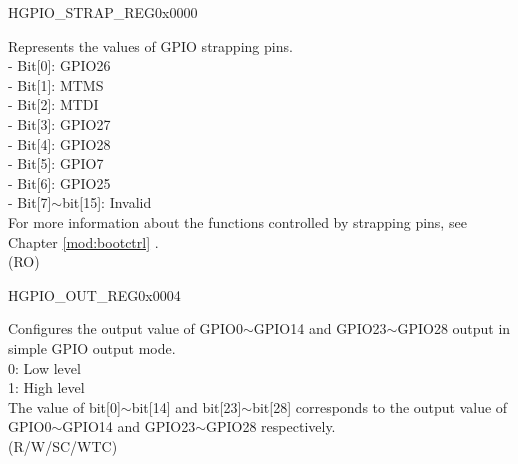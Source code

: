 \begin{register}{H}{GPIO\_STRAP\_REG}{0x0000}\label{regdesc:GPIOSTRAPREG}
%
%
\regnewline%
\begin{regdesc}\begin{reglist}
\label{fielddesc:GPIOSTRAPPING}\item [GPIO\_STRAPPING] Represents the values of GPIO strapping pins. \\
    - Bit[0]: GPIO26\\
    - Bit[1]: MTMS\\
    - Bit[2]: MTDI\\
    - Bit[3]: GPIO27\\
    - Bit[4]: GPIO28\\
    - Bit[5]: GPIO7\\
    - Bit[6]: GPIO25\\
    - Bit[7]$\sim$bit[15]: Invalid\\
For more information about the functions controlled by strapping pins, see Chapter \ref{mod:bootctrl} \textit{}.\\
 (RO)
\end{reglist}\end{regdesc}
\end{register}


\begin{register}{H}{GPIO\_OUT\_REG}{0x0004}\label{regdesc:GPIOOUTREG}
%
\regnewline%
\begin{regdesc}\begin{reglist}
\label{fielddesc:GPIOOUTDATAORIG}\item [GPIO\_OUT\_DATA\_ORIG] Configures the output value of GPIO0$\sim$GPIO14 and GPIO23$\sim$GPIO28 output in simple GPIO output mode.\\
0: Low level\\
1: High level\\ 
The value of bit[0]$\sim$bit[14] and bit[23]$\sim$bit[28] corresponds to the output value of GPIO0$\sim$GPIO14 and GPIO23$\sim$GPIO28 respectively.\\
(R/W/SC/WTC)
\end{reglist}\end{regdesc}
\end{register}


